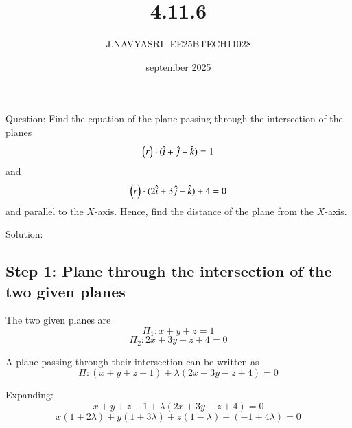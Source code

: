 \documentclass{beamer}
\title %
{4.11.6}
\date{september 2025}
\author %
{J.NAVYASRI- EE25BTECH11028}
\begin{document}
\frame{\titlepage}
\begin{frame}{Question:}
Find the equation of the plane passing through the intersection of the planes 
\[
\begin{pmatrix}r\end{pmatrix} \cdot (\hat{i} + \hat{j} + \hat{k}) = 1
\]
and 
\[
\begin{pmatrix}r\end{pmatrix} \cdot (2\hat{i} + 3\hat{j} - \hat{k}) + 4 = 0
\]
and parallel to the $X$-axis. Hence, find the distance of the plane from the $X$-axis.
 
\end{frame}


\begin{frame}{Solution:}
    \subsection*{Step 1: Plane through the intersection of the two given planes}

The two given planes are
\begin{equation}
\Pi_1: x + y + z = 1
\end{equation}
\begin{equation}
\Pi_2: 2x + 3y - z + 4 = 0
\end{equation}

A plane passing through their intersection can be written as
\begin{equation}
\Pi: (x + y + z - 1) + \lambda (2x + 3y - z + 4) = 0
\end{equation}

Expanding:
\begin{equation}
x + y + z - 1 + \lambda(2x + 3y - z + 4) = 0
\end{equation}
\begin{equation}
x(1 + 2\lambda) + y(1 + 3\lambda) + z(1 - \lambda) + (-1 + 4\lambda) = 0
\end{equation}
\end{frame}
\end{document}
